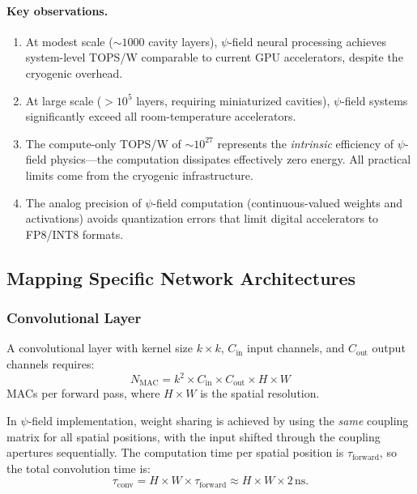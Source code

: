 \documentclass[11pt,twocolumn]{article}
\theoremstyle{definition}
\theoremstyle{remark}
\begin{document}
\paragraph{Key observations.}
\begin{enumerate}
\item At modest scale ($\sim 1000$ cavity layers), $\psi$-field neural
processing achieves system-level TOPS/W comparable to current GPU
accelerators, despite the cryogenic overhead.
\item At large scale ($> 10^5$ layers, requiring miniaturized cavities),
$\psi$-field systems significantly exceed all room-temperature
accelerators.
\item The compute-only TOPS/W of $\sim 10^{27}$ represents the
\emph{intrinsic} efficiency of $\psi$-field physics---the
computation dissipates effectively zero energy. All practical limits come
from the cryogenic infrastructure.
\item The analog precision of $\psi$-field computation
(continuous-valued weights and activations) avoids quantization errors
that limit digital accelerators to FP8/INT8 formats.
\end{enumerate}

\subsection{Mapping Specific Network Architectures}\label{sec:architectures}

\subsubsection{Convolutional Layer}

A convolutional layer with kernel size $k \times k$, $C_{\mathrm{in}}$
input channels, and $C_{\mathrm{out}}$ output channels requires:
\begin{equation}
N_{\mathrm{MAC}} = k^2 \times C_{\mathrm{in}} \times C_{\mathrm{out}} \times H \times W
\end{equation}
MACs per forward pass, where $H \times W$ is the spatial resolution.

In $\psi$-field implementation, weight sharing is achieved by using the
\emph{same} coupling matrix for all spatial positions, with the input
shifted through the coupling apertures sequentially. The computation
time per spatial position is $\tau_{\mathrm{forward}}$, so the total
convolution time is:
\begin{equation}
\tau_{\mathrm{conv}} = H \times W \times \tau_{\mathrm{forward}} \approx H \times W \times 2\,\mathrm{ns}.
\end{equation}
\end{document}
